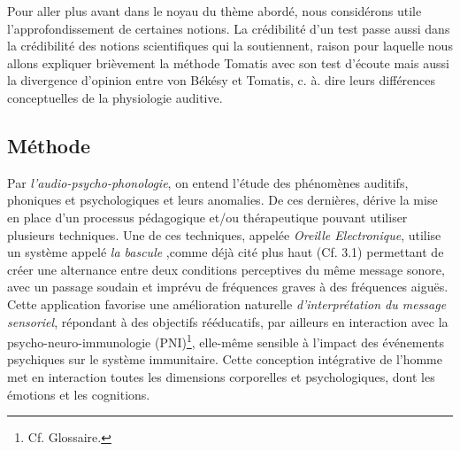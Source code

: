 

Pour aller plus avant dans le noyau du thème abordé, nous considérons utile
l'approfondissement de certaines notions. La crédibilité d'un test passe aussi dans la crédibilité des 
notions scientifiques qui la soutiennent, raison pour laquelle nous allons expliquer brièvement  la 
méthode Tomatis avec son test d'écoute mais aussi la
divergence d'opinion entre von Békésy et Tomatis, c. à. dire leurs différences conceptuelles de la 
physiologie auditive. 
\subsection{Méthode}

Par {\textit{l'audio-psycho-phonologie}}, on entend l'étude des
phénomènes auditifs, phoniques et psychologiques et leurs anomalies.
De ces dernières,  dérive la mise en place d'un processus pédagogique
et/ou thérapeutique pouvant
utiliser plusieurs techniques.
Une de ces techniques,
  appelée
\label{outil_oreille_electro}
\textit{Oreille Electronique}, utilise
un système appelé \textit{ la
bascule} \autocite{escera-key},comme déjà cité plus haut (Cf. 3.1) permettant de créer une alternance 
entre deux conditions perceptives
du même message sonore, avec un passage soudain et imprévu de fréquences graves à des
fréquences aiguës.
Cette application favorise une amélioration naturelle \emph{d'interprétation du message
sensoriel}, répondant à des objectifs rééducatifs, par ailleurs en
interaction avec la psycho-neuro-immunologie (\gls{PNI})\footnote{Cf. Glossaire.}, elle-même sensible à
l'impact des événements psychiques sur le système immunitaire.
Cette conception intégrative de l'homme met en interaction toutes les
dimensions corporelles et psychologiques, dont les émotions et les cognitions.

